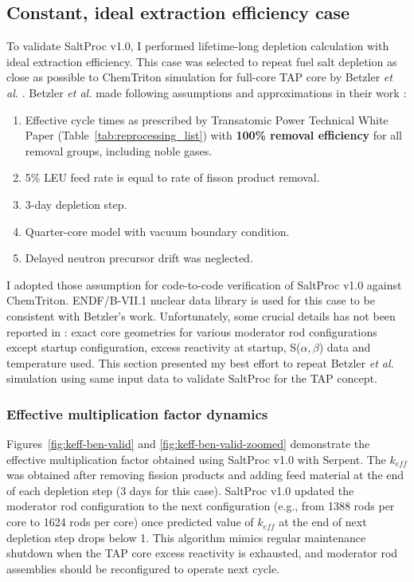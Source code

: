 \subsection{Constant, ideal extraction efficiency case}
To validate SaltProc v1.0, I performed lifetime-long depletion calculation 
with ideal extraction efficiency. This case was selected to repeat fuel salt 
depletion as close as possible to ChemTriton simulation for full-core 
\gls{TAP} core by Betzler \emph{et al.} \cite{betzler_assessment_2017-1}.  
Betzler \emph{et al.} made following assumptions and approximations in their 
work \cite{betzler_assessment_2017-1}:
\begin{enumerate}[noitemsep]	
	\item Effective cycle times as prescribed by Transatomic Power Technical 
	White Paper (Table~\ref{tab:reprocessing_list}) with \textbf{100\% removal 
	efficiency} for all removal groups, including noble gases.
	\item 5\% \gls{LEU} feed rate is equal to rate of fisson product removal.
	\item 3-day depletion step.
	\item Quarter-core model with vacuum boundary condition.
	\item Delayed neutron precursor drift was neglected.
\end{enumerate}
I adopted those assumption for code-to-code verification of SaltProc v1.0 
against ChemTriton. ENDF/B-VII.1 \cite{chadwick_endf/b-vii.1_2011} nuclear 
data library is used for this case to be consistent with Betzler's work.
Unfortunately, some crucial details has not been reported in 
\cite{betzler_assessment_2017-1}: exact core geometries for various moderator 
rod configurations except startup configuration, excess reactivity at startup, 
S($\alpha, \beta$) data and temperature used. This section presented my best 
effort to repeat Betzler \emph{et al.} simulation using same input data to 
validate SaltProc for the \gls{TAP} concept.


\subsubsection{Effective multiplication factor dynamics}
Figures~\ref{fig:keff-ben-valid} and \ref{fig:keff-ben-valid-zoomed} 
demonstrate the effective multiplication factor obtained using SaltProc v1.0 
with Serpent. The $k_{eff}$ was obtained after removing fission products and 
adding feed material at the end of each depletion step (3 days for this case). 
SaltProc v1.0 updated the moderator rod configuration to the next 
configuration (e.g., from 1388 rods per core to 1624 rods per core) once 
predicted value of $k_{eff}$ at the end of next depletion step drops below 1. 
This algorithm mimics regular maintenance shutdown when the \gls{TAP} core 
excess reactivity is exhausted, and moderator rod assemblies should be 
reconfigured to operate next cycle. 

